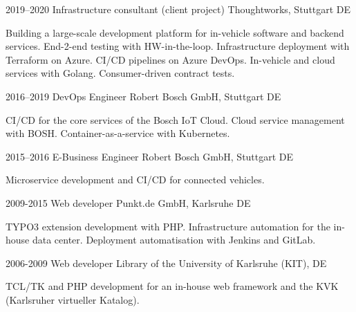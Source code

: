 \documentclass[]{friggeri-cv} %
\begin{document}
\begin{entrylist}
\entry
{2019--2020}
{Infrastructure consultant (client project)}
{Thoughtworks, Stuttgart DE}
{Building a large-scale development platform for in-vehicle software and backend services. End-2-end testing with HW-in-the-loop. Infrastructure deployment with Terraform on Azure. CI/CD pipelines on Azure DevOps. In-vehicle and cloud services with Golang. Consumer-driven contract tests.

}
\end{entrylist}
\begin{entrylist}
\entry
{2016--2019}
{DevOps Engineer}
{Robert Bosch GmbH, Stuttgart DE}
{CI/CD for the core services of the Bosch IoT Cloud. Cloud service management with BOSH. Container-as-a-service with Kubernetes.

}
\end{entrylist}
\begin{entrylist}
\entry
{2015--2016}
{E-Business Engineer}
{Robert Bosch GmbH, Stuttgart DE}
{Microservice development and CI/CD for connected vehicles.

}
\end{entrylist}
\begin{entrylist}
\entry
{2009-2015}
{Web developer}
{Punkt.de GmbH, Karlsruhe DE}
{TYPO3 extension development with PHP. Infrastructure automation for the in-house data center. Deployment automatisation with Jenkins and GitLab.

}
\end{entrylist}
\begin{entrylist}
  \entry
  {2006-2009}
  {Web developer}
  {Library of the University of Karlsruhe (KIT), DE}
  {TCL/TK and PHP development for an in-house web framework and the KVK (Karlsruher virtueller Katalog).
  
  }
  \end{entrylist}
\end{document}

